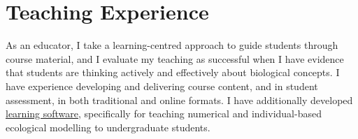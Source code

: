 \documentclass[letterpaper]{article}
\begin{document}

\section*{Teaching Experience}
\hrulefill


As an educator, I take a learning-centred approach to guide students through course material, and I evaluate my teaching as successful when I have evidence that students are thinking actively and effectively about biological concepts. I have experience developing and delivering course content, and in student assessment, in both traditional and online formats. I have additionally developed \href{https://bradduthie.shinyapps.io/EcoEdu/}{learning software}, specifically for teaching numerical and individual-based ecological modelling to undergraduate students.

\hrulefill

\end{document}
